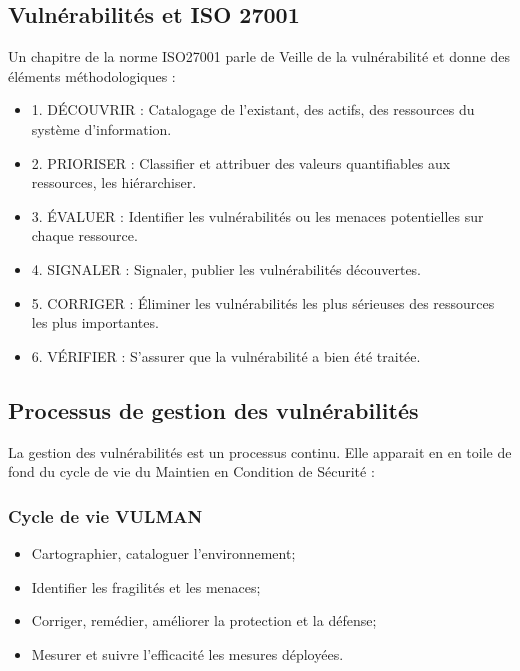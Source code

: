 

\subsection{Vulnérabilités et ISO 27001}

Un chapitre de la norme ISO27001 parle de Veille de la vulnérabilité et donne des éléments méthodologiques : 

\begin{itemize}
	\item 1. DÉCOUVRIR : Catalogage de l’existant, des actifs, des ressources du système d’information. 
 	\item 2. PRIORISER : Classifier et attribuer des valeurs quantifiables aux ressources, les hiérarchiser. 
 	\item 3. ÉVALUER : Identifier les vulnérabilités ou les menaces potentielles sur chaque ressource. 
	 \item 4. SIGNALER : Signaler, publier les vulnérabilités découvertes. 
 	\item 5. CORRIGER : Éliminer les vulnérabilités les plus sérieuses des ressources les plus importantes. 
 	\item 6. VÉRIFIER : S’assurer que la vulnérabilité a bien été traitée. 
\end{itemize}


\subsection{Processus de gestion des vulnérabilités}

La gestion des vulnérabilités est un processus continu. Elle apparait en en toile de fond du cycle de vie du Maintien en Condition de Sécurité :

\begin{frame}
\frametitle<presentation>{Cycle de vie VULMAN}
\begin{itemize}
	\item Cartographier, cataloguer l'environnement; 
	\item Identifier les fragilités et les menaces;
	\item Corriger, remédier, améliorer la protection et la défense;
	\item Mesurer et suivre l'efficacité les mesures déployées.
\end{itemize}
\end{frame}

